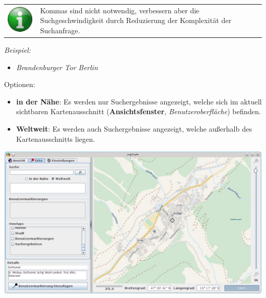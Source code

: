 \documentclass[10pt]{scrreprt}
\newcommand{\textref}[1]{\mbox{\raisebox{0.1ex}{\small$\rightarrow$ }\textit{#1}}}
\begin{document}
\vspace{5mm}
\begin{tabular}{>{\centering \arraybackslash}m{1cm} m{14cm}}
\includegraphics[scale=0.5]{images/info.eps} & Kommas sind nicht notwendig, verbessern aber die Suchgeschwindigkeit durch Reduzierung der Komplexität der Suchanfrage. \\ 
\end{tabular} 

\vspace{3mm}
\textit{Beispiel:}
\begin{itemize}
\item \textit{Brandenburger Tor Berlin}
\end{itemize}

\vspace{3mm}
Optionen:
\begin{itemize}
\item \textbf{in der Nähe}: Es werden nur Suchergebnisse angezeigt, welche sich im aktuell sichtbaren Kartenausschnitt (\textbf{Ansichtsfenster}, \textref{Benutzeroberfläche}) befinden.
\item \textbf{Weltweit}: Es werden auch Suchergebnisse angezeigt, welche außerhalb des Kartenausschnitts liegen.
\end{itemize}

\vspace{3mm}
\begin{center}
\includegraphics[scale=0.3]{images/Benutzermarkierungs_Dialog5.png}
\end{center}
\end{document}
